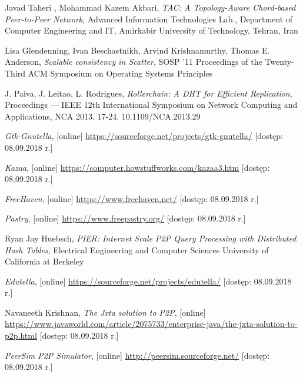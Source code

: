 \documentclass[12pt, twoside, openany]{report}
\begin{document}
\begin{thebibliography}{11}
 Javad Taheri , Mohammad Kazem Akbari, \emph{TAC: A Topology-Aware Chord-based Peer-to-Peer Network}, Advanced Information Technologies Lab., Department of Computer Engineering and IT, Amirkabir University of Technology, Tehran, Iran

 Lisa Glendenning, Ivan Beschastnikh, Arvind Krishnamurthy, Thomas E. Anderson, \emph{Scalable consistency in Scatter}, SOSP '11 Proceedings of the Twenty-Third ACM Symposium on Operating Systems Principles

 J. Paiva, J. Leitao, L. Rodrigues, \emph{Rollerchain: A DHT for Efficient Replication}, Proceedings --- IEEE 12th International Symposium on Network Computing and Applications, NCA 2013. 17-24. 10.1109/NCA.2013.29

 \emph{Gtk-Gnutella}, [online] \url{https://sourceforge.net/projects/gtk-gnutella/} [dostęp: 08.09.2018 r.]

 \emph{Kazaa}, [online] \url{https://computer.howstuffworks.com/kazaa3.htm} [dostęp: 08.09.2018 r.]

 \emph{FreeHaven}, [online] \url{https://www.freehaven.net/} [dostęp: 08.09.2018 r.]

 \emph{Pastry}, [online] \url{https://www.freepastry.org/} [dostęp: 08.09.2018 r.]

 Ryan Jay Huebsch, \emph{PIER: Internet Scale P2P Query Processing with Distributed Hash Tables}, Electrical Engineering and Computer Sciences University of California at Berkeley

 \emph{Edutella}, [online] \url{https://sourceforge.net/projects/edutella/} [dostęp: 08.09.2018 r.]

 Navaneeth Krishnan, \emph{The Jxta solution to P2P}, [online] \url{https://www.javaworld.com/article/2075733/enterprise-java/the-jxta-solution-to-p2p.html} [dostęp: 08.09.2018 r.]

 \emph{PeerSim P2P Simulator}, [online] \url{http://peersim.sourceforge.net/} [dostęp: 08.09.2018 r.]


\end{thebibliography}
\end{document}
